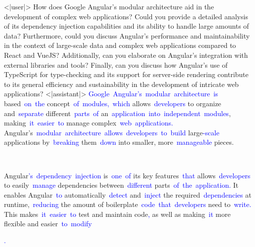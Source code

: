 \documentclass{article}
\begin{document}
\begin{tcolorbox}[colframe=black,colback=white]
<|user|>
How does Google Angular's modular architecture aid in the development of complex web applications? Could you provide a detailed analysis of its dependency injection capabilities and its ability to handle large amounts of data? Furthermore, could you discuss Angular's performance and maintainability in the context of large-scale data and complex web applications compared to React and VueJS? Additionally, can you elaborate on Angular's integration with external libraries and tools? Finally, can you discuss how Angular's use of TypeScript for type-checking and its support for server-side rendering contribute to its general efficiency and sustainability in the development of intricate web applications?
<|assistant|>
\textcolor{blue}{Google}\textcolor{blue}{~Angular}\textcolor{blue}{'s}\textcolor{blue}{~modular}\textcolor{blue}{~architecture}\textcolor{blue}{~is} based\textcolor{blue}{~on}\textcolor{blue}{~the} concept\textcolor{blue}{~of}\textcolor{blue}{~modules}\textcolor{blue}{,}\textcolor{blue}{~which} allows\textcolor{blue}{~developers} to organize and\textcolor{blue}{~separate} different\textcolor{blue}{~parts}\textcolor{blue}{~of} an\textcolor{blue}{~application}\textcolor{blue}{~into}\textcolor{blue}{~independent}\textcolor{blue}{~modules}, making\textcolor{blue}{~it}\textcolor{blue}{~easier}\textcolor{blue}{~to} manage complex\textcolor{blue}{~web}\textcolor{blue}{~applications}\textcolor{blue}{.} Angular's\textcolor{blue}{~modular}\textcolor{blue}{~architecture}\textcolor{blue}{~allows}\textcolor{blue}{~developers}\textcolor{blue}{~to}\textcolor{blue}{~build} large\textcolor{blue}{-scale} applications by\textcolor{blue}{~breaking} them\textcolor{blue}{~down} into smaller, more\textcolor{blue}{~manageable} pieces.\textcolor{blue}{~

}Angular\textcolor{blue}{'s}\textcolor{blue}{~dependency}\textcolor{blue}{~injection} is\textcolor{blue}{~one}\textcolor{blue}{~of} its key features\textcolor{blue}{~that} allows\textcolor{blue}{~developers} to easily\textcolor{blue}{~manage} dependencies between\textcolor{blue}{~different} parts\textcolor{blue}{~of}\textcolor{blue}{~the}\textcolor{blue}{~application}\textcolor{blue}{.} It enables Angular\textcolor{blue}{~to} automatically\textcolor{blue}{~detect} and\textcolor{blue}{~inject} the required\textcolor{blue}{~dependencies} at runtime,\textcolor{blue}{~reducing} the amount of boilerplate\textcolor{blue}{~code}\textcolor{blue}{~that}\textcolor{blue}{~developers} need to\textcolor{blue}{~write}\textcolor{blue}{.} This makes\textcolor{blue}{~it}\textcolor{blue}{~easier}\textcolor{blue}{~to} test and maintain code\textcolor{blue}{,} as well as making\textcolor{blue}{~it} more flexible and easier\textcolor{blue}{~to}\textcolor{blue}{~modify}\textcolor{blue}{.

}
\end{tcolorbox}
\end{document}
